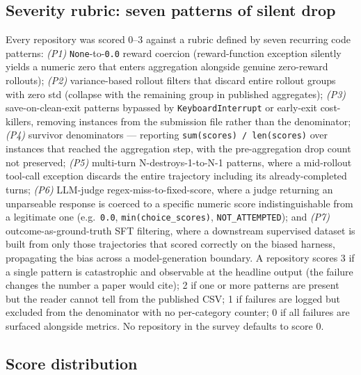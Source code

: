 \documentclass{article}
\begin{document}
\subsection{Severity rubric: seven patterns of silent drop}
\label{app:survey:rubric}

Every repository was scored 0--3 against a rubric defined by
seven recurring code patterns:
\emph{(P1)} \texttt{None}-to-\texttt{0.0} reward coercion
(reward-function exception silently yields a numeric zero that
enters aggregation alongside genuine zero-reward rollouts);
\emph{(P2)} variance-based rollout filters that discard entire
rollout groups with zero std (collapse with the remaining group
in published aggregates); \emph{(P3)}
save-on-clean-exit patterns bypassed by
\texttt{KeyboardInterrupt} or early-exit cost-killers, removing
instances from the submission file rather than the denominator;
\emph{(P4)} survivor denominators --- reporting
\texttt{sum(scores) / len(scores)} over instances that reached
the aggregation step, with the pre-aggregation drop count not
preserved; \emph{(P5)} multi-turn N-destroys-1-to-N-1 patterns,
where a mid-rollout tool-call exception discards the entire
trajectory including its already-completed turns; \emph{(P6)}
LLM-judge regex-miss-to-fixed-score, where a judge returning
an unparseable response is coerced to a specific numeric score
indistinguishable from a legitimate one (e.g.\ \texttt{0.0},
\texttt{min(choice\_scores)}, \texttt{NOT\_ATTEMPTED}); and
\emph{(P7)} outcome-as-ground-truth SFT filtering, where a
downstream supervised dataset is built from only those
trajectories that scored correctly on the biased harness,
propagating the bias across a model-generation boundary. A
repository scores 3 if a single pattern is catastrophic and
observable at the headline output (the failure changes the
number a paper would cite); 2 if one or more patterns are
present but the reader cannot tell from the published CSV; 1 if
failures are logged but excluded from the denominator with no
per-category counter; 0 if all failures are surfaced alongside
metrics. No repository in the survey defaults to score 0.

\subsection{Score distribution}
\label{app:survey:distribution}
\end{document}
